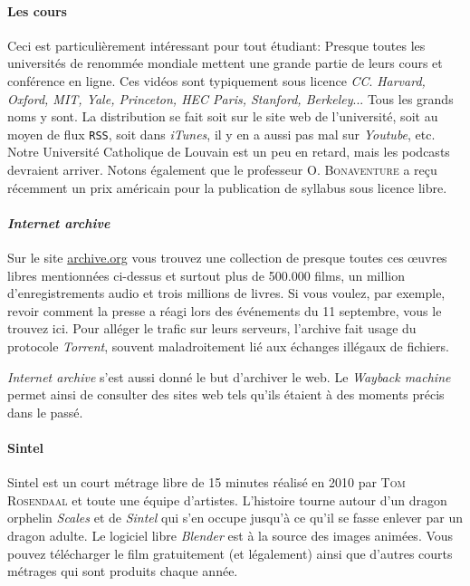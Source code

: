 \documentclass[10pt]{../fiche}
\begin{document}
\paragraph{Les cours}
Ceci est particulièrement intéressant pour tout étudiant: Presque toutes les universités de renommée mondiale mettent une grande partie de leurs cours et conférence en ligne.
Ces vidéos sont typiquement sous licence \textit{CC}. \textit{Harvard, Oxford, MIT, Yale, Princeton, HEC Paris, Stanford, Berkeley}... Tous les grands noms y sont.
La distribution se fait soit sur le site web de l'université, soit au moyen de flux \texttt{RSS}, soit dans \textit{iTunes}, il y en a aussi pas mal sur \textit{Youtube}, etc.
Notre Université Catholique de Louvain est un peu en retard, mais les podcasts devraient arriver.
Notons également que le professeur O. \textsc{Bonaventure} a reçu récemment un prix américain pour la publication de syllabus sous licence libre. %

\paragraph{\textit{Internet archive}}
Sur le site \url{archive.org} vous trouvez une collection de presque toutes ces \oe uvres libres mentionnées ci-dessus et surtout plus de 500.000 films, un million d’enregistrements audio et trois millions de livres.
Si vous voulez, par exemple, revoir comment la presse a réagi lors des événements du 11 septembre, vous le trouvez ici.
Pour alléger le trafic sur leurs serveurs, l'archive fait usage du protocole \textit{Torrent}, souvent maladroitement lié aux échanges illégaux de fichiers.

\textit{Internet archive} s'est aussi donné le but d'archiver le web. Le \textit{Wayback machine} permet ainsi de consulter des sites web tels qu'ils étaient à des moments précis dans le passé.

\paragraph{Sintel}
Sintel est un court métrage libre de 15 minutes réalisé en 2010 par \textsc{Tom Rosendaal} et toute une équipe d'artistes.
L'histoire tourne autour d'un dragon orphelin \textit{Scales} et de \textit{Sintel} qui s'en occupe jusqu'à ce qu'il se fasse enlever par un dragon adulte.
Le logiciel libre \textit{Blender} est à la source des images animées.
Vous pouvez télécharger le film gratuitement (et légalement) ainsi que d'autres courts métrages qui sont produits chaque année.
\end{document}

